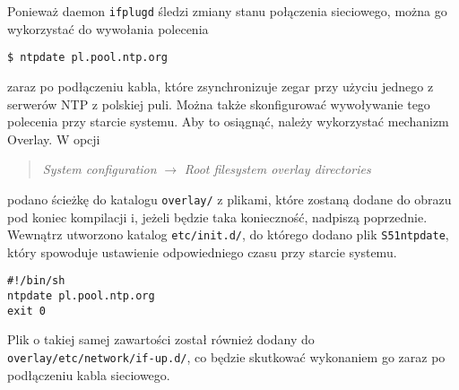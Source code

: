\documentclass[10pt,a4paper]{article}
\begin{document}
\newpage\noindent
Ponieważ daemon \texttt{ifplugd} śledzi zmiany stanu połączenia sieciowego, można go wykorzystać do wywołania polecenia
\begin{lstlisting}[style=bash]
$ ntpdate pl.pool.ntp.org
\end{lstlisting}
zaraz po podłączeniu kabla, które zsynchronizuje zegar przy użyciu jednego z serwerów NTP z polskiej puli. Można także skonfigurować wywoływanie tego polecenia przy starcie systemu. Aby to osiągnąć, należy wykorzystać mechanizm Overlay. W opcji
\begin{quote}
\textit{System configuration} $\rightarrow$ \textit{Root filesystem overlay directories}
\end{quote}
podano ścieżkę do katalogu \texttt{overlay/} z plikami, które zostaną dodane do obrazu pod koniec kompilacji i, jeżeli będzie taka konieczność, nadpiszą poprzednie. Wewnątrz utworzono katalog \texttt{etc/init.d/}, do którego dodano plik \texttt{S51ntpdate}, który spowoduje ustawienie odpowiedniego czasu przy starcie systemu.
\begin{lstlisting}[style=bash, caption={Zawartość pliku S51ntpdate}]
#!/bin/sh
ntpdate pl.pool.ntp.org
exit 0
\end{lstlisting}
Plik o takiej samej zawartości został również dodany do \texttt{overlay/etc/network/if-up.d/}, co będzie skutkować wykonaniem go zaraz po podłączeniu kabla sieciowego.
\end{document}
